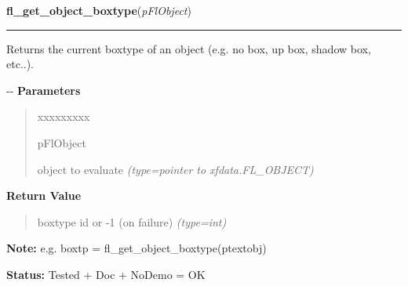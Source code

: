 \hspace{.8\funcindent}\begin{boxedminipage}{\funcwidth}

    \raggedright \textbf{fl\_get\_object\_boxtype}(\textit{pFlObject})

    \vspace{-1.5ex}

    \rule{\textwidth}{0.5\fboxrule}
\setlength{\parskip}{2ex}

Returns the current boxtype of an object (e.g. no box, up box,
shadow box, etc..).

-{}-
\setlength{\parskip}{1ex}
      \textbf{Parameters}
      \vspace{-1ex}

      \begin{quote}
        \begin{Ventry}{xxxxxxxxx}

          \item[pFlObject]


object to evaluate
            {\it (type=pointer to xfdata.FL\_OBJECT)}

        \end{Ventry}

      \end{quote}

      \textbf{Return Value}
    \vspace{-1ex}

      \begin{quote}

boxtype id or -1 (on failure)
      {\it (type=int)}

      \end{quote}

\textbf{Note:} 
e.g. boxtp = fl\_get\_object\_boxtype(ptextobj)


\textbf{Status:} 
Tested + Doc + NoDemo = OK


    \end{boxedminipage}

    \label{xformslib:flbasic:fl_set_object_bw}

    \vspace{0.5ex}

